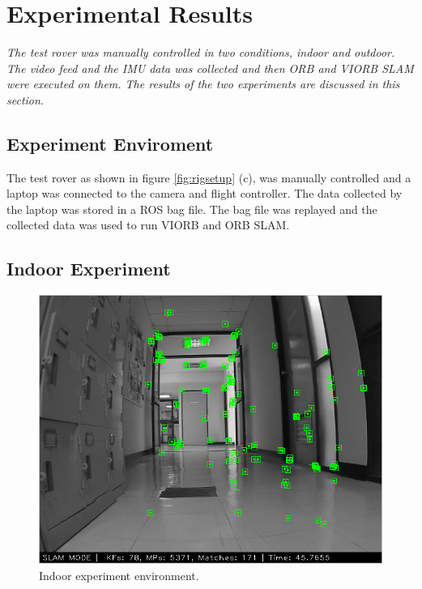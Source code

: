 \setlength{\footskip}{8mm}

\chapter{Experimental Results}
\label{ch:results}

\textit{The test rover was manually controlled in two conditions, indoor and outdoor. The video feed and the IMU data was collected and then ORB and VIORB SLAM were executed on them. The results of the two experiments are discussed in this section. }


\section{Experiment Enviroment}

The test rover as shown in figure \ref{fig:rigsetup} (c), was manually controlled and a laptop was connected to the camera and flight controller. The data collected by the laptop was stored in a ROS bag file. The bag file was replayed and the collected data was used to run VIORB and ORB SLAM. 

\section{Indoor Experiment}
\begin{figure} [!h]
	\centering
	\includegraphics[width=5in]{figures/demo2_screen}
	\caption[Indoor experiment environment]{\small 
		Indoor experiment environment. }
	\label{fig:indoor-experiment-live}
\end{figure}

